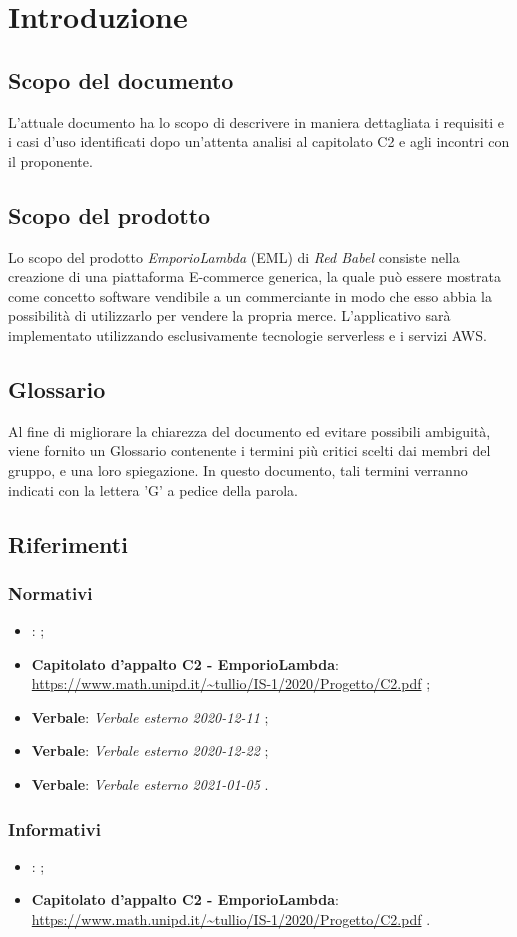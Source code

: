 \section{Introduzione}
\subsection{Scopo del documento}
L'attuale documento ha lo scopo di descrivere in maniera dettagliata i requisiti e i casi d'uso identificati dopo un'attenta analisi al capitolato C2 e agli incontri con il proponente.
\subsection{Scopo del prodotto}
Lo scopo del prodotto \textit{EmporioLambda} (EML) di \textit{Red Babel} consiste nella creazione di una piattaforma E-commerce generica, la quale può essere mostrata come concetto software vendibile a un commerciante in modo che esso abbia la possibilità di utilizzarlo per vendere la propria merce. L'applicativo sarà implementato utilizzando esclusivamente tecnologie serverless e i servizi AWS.
\subsection{Glossario}
Al fine di migliorare la chiarezza del documento ed evitare possibili ambiguità, viene fornito un Glossario contenente i termini più critici scelti dai membri del gruppo, e una loro spiegazione. In questo documento, tali termini verranno indicati con la lettera 'G' a pedice della parola.
\subsection{Riferimenti}
\subsubsection{Normativi}
\begin{itemize}
\item \textbf{\NdP}:  ;
\item \textbf{Capitolato d'appalto C2 - EmporioLambda}: \\ \url{https://www.math.unipd.it/~tullio/IS-1/2020/Progetto/C2.pdf} ;
\item \textbf{Verbale}: \textit{Verbale esterno 2020-12-11} ;
\item \textbf{Verbale}: \textit{Verbale esterno 2020-12-22} ;
\item \textbf{Verbale}: \textit{Verbale esterno 2021-01-05} .
\end{itemize}
\subsubsection{Informativi}
\begin{itemize}
\item \textbf{\SdF}:  ;
\item \textbf{Capitolato d'appalto C2 - EmporioLambda}: \\ \url{https://www.math.unipd.it/~tullio/IS-1/2020/Progetto/C2.pdf} .
\end{itemize}